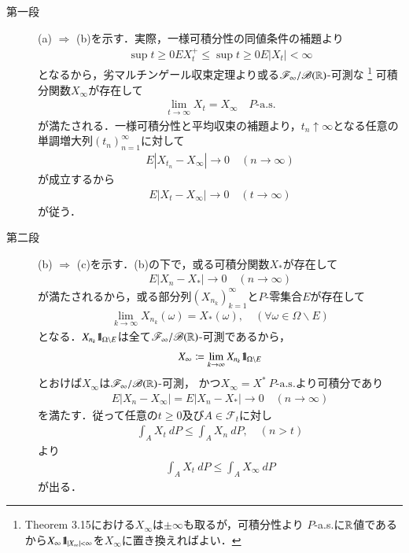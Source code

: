 	\begin{prf}\mbox{}
		\begin{description}
			\item[第一段]
				(a) $\Rightarrow$ (b)を示す．実際，一様可積分性の同値条件の補題より
				\begin{align}
					\sup{t \geq 0}{EX_t^+} \leq \sup{t \geq 0}{E|X_t|} < \infty
				\end{align}
				となるから，劣マルチンゲール収束定理より或る$\mathscr{F}_\infty/\mathscr{B}(\mathbb{R})$-可測な
				\footnote{
					Theorem 3.15における$X_\infty$は$\pm \infty$も取るが，可積分性より
					$P$-a.s.に$\mathbb{R}$値であるから$X_\infty \mbox{1}\hspace{-0.25em}\mbox{l}_{|X_\infty|<\infty}$を$X_\infty$に置き換えればよい．
				}
				可積分関数$X_\infty$が存在して
				\begin{align}
					\lim_{t \to \infty} X_t = X_\infty
					\quad \mbox{$P$-a.s.}
				\end{align}
				が満たされる．一様可積分性と平均収束の補題より，$t_n \uparrow \infty$となる任意の単調増大列$(t_n)_{n=1}^\infty$に対して
				\begin{align}
					E|X_{t_n} - X_\infty| \longrightarrow 0
					\quad (n \longrightarrow \infty)
				\end{align}
				が成立するから
				\begin{align}
					E|X_t - X_\infty| \longrightarrow 0
					\quad (t \longrightarrow \infty)
				\end{align}
				が従う．
			
			\item[第二段]
				(b) $\Rightarrow$ (c)を示す．(b)の下で，或る可積分関数$X_*$が存在して
				\begin{align}
					E|X_n - X_*| \longrightarrow 0
					\quad (n \longrightarrow \infty)
				\end{align}
				が満たされるから，或る部分列$\left( X_{n_k} \right)_{k=1}^\infty$と$P$-零集合$E$が存在して
				\begin{align}
					\lim_{k \to \infty} X_{n_k}(\omega) = X_*(\omega),
					\quad (\forall \omega \in \Omega \backslash E)
				\end{align}
				となる．$X_{n_k}\mbox{1}\hspace{-0.25em}\mbox{l}_{\Omega \backslash E}$は全て$\mathscr{F}_\infty/\mathscr{B}(\mathbb{R})$-可測であるから，
				\begin{align}
					X_\infty \coloneqq \lim_{k \to \infty} X_{n_k} \mbox{1}\hspace{-0.25em}\mbox{l}_{\Omega \backslash E}
				\end{align}
				とおけば$X_\infty$は$\mathscr{F}_\infty/\mathscr{B}(\mathbb{R})$-可測，
				かつ$X_\infty = X^*\ \mbox{$P$-a.s.}$より可積分であり
				\begin{align}
					E|X_n - X_\infty| = E|X_n - X_*| \longrightarrow 0
					\quad (n \longrightarrow \infty)
				\end{align}
				を満たす．従って任意の$t \geq 0$及び$A \in \mathscr{F}_t$に対し
				\begin{align}
					\int_A X_t\ dP \leq \int_A X_n\ dP,
					\quad (n > t)
					\label{eq:chapter_1_Problem_3_19_1}
				\end{align}
				より
				\begin{align}
					\int_A X_t\ dP \leq \int_A X_\infty\ dP
					\label{eq:chapter_1_Problem_3_19_2}
				\end{align}
				が出る．
				

\end{description}
\end{prf}
